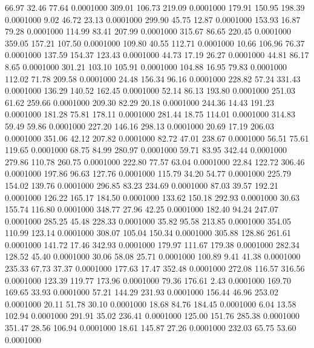   66.97   32.46   77.64   0.0001000
 309.01  106.73  219.09   0.0001000
 179.91  150.95  198.39   0.0001000
   9.02   46.72   23.13   0.0001000
 299.90   45.75   12.87   0.0001000
 153.93   16.87   79.28   0.0001000
 114.99   83.41  207.99   0.0001000
 315.67   86.65  220.45   0.0001000
 359.05  157.21  107.50   0.0001000
 109.80   40.55  112.71   0.0001000
  10.66  106.96   76.37   0.0001000
 137.59  154.37  123.43   0.0001000
  44.73   17.19   26.27   0.0001000
  44.81   86.17    8.65   0.0001000
 301.21  103.10  105.91   0.0001000
 104.88   16.95   79.83   0.0001000
 112.02   71.78  209.58   0.0001000
  24.48  156.34   96.16   0.0001000
 228.82   57.24  331.43   0.0001000
 136.29  140.52  162.45   0.0001000
  52.14   86.13  193.80   0.0001000
 251.03   61.62  259.66   0.0001000
 209.30   82.29   20.18   0.0001000
 244.36   14.43  191.23   0.0001000
 181.28   75.81  178.11   0.0001000
 281.44   18.75  114.01   0.0001000
 314.83   59.49   59.86   0.0001000
 227.20  146.16  298.13   0.0001000
  20.69   17.19  206.03   0.0001000
 351.06   42.12  207.82   0.0001000
  82.72   47.01  238.67   0.0001000
  56.51   75.61  119.65   0.0001000
  68.75   84.99  280.97   0.0001000
  59.71   83.95  342.44   0.0001000
 279.86  110.78  260.75   0.0001000
 222.80   77.57   63.04   0.0001000
  22.84  122.72  306.46   0.0001000
 197.86   96.63  127.76   0.0001000
 115.79   34.20   54.77   0.0001000
 225.79  154.02  139.76   0.0001000
 296.85   83.23  234.69   0.0001000
  87.03   39.57  192.21   0.0001000
 126.22  165.17  184.50   0.0001000
 133.62  150.18  292.93   0.0001000
  30.63  155.74  116.80   0.0001000
 348.77   27.96   42.25   0.0001000
 182.40   94.24  247.07   0.0001000
 285.25   45.48  228.33   0.0001000
  35.82   95.58  213.85   0.0001000
 354.05  110.99  123.14   0.0001000
 308.07  105.04  150.34   0.0001000
 305.88  128.86  261.61   0.0001000
 141.72   17.46  342.93   0.0001000
 179.97  111.67  179.38   0.0001000
 282.34  128.52   45.40   0.0001000
  30.06   58.08   25.71   0.0001000
 100.89    9.41   41.38   0.0001000
 235.33   67.73   37.37   0.0001000
 177.63   17.47  352.48   0.0001000
 272.08  116.57  316.56   0.0001000
 123.39  119.77  173.96   0.0001000
  79.36  176.61    2.43   0.0001000
 169.70  169.65   33.93   0.0001000
  57.21  144.29  231.93   0.0001000
 156.44   46.96  253.02   0.0001000
  20.11   51.78   30.10   0.0001000
  18.68   84.76  184.45   0.0001000
   6.04   13.58  102.94   0.0001000
 291.91   35.02  236.41   0.0001000
 125.00  151.76  285.38   0.0001000
 351.47   28.56  106.94   0.0001000
  18.61  145.87   27.26   0.0001000
 232.03   65.75   53.60   0.0001000
